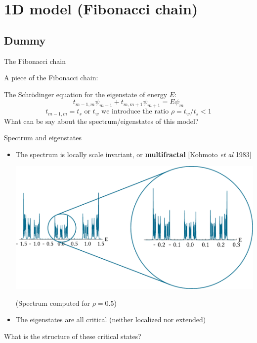 \documentclass[xcolor=x11names,compress,professionalfonts, aspectratio=169]{beamer}
\renewcommand{\(}{\begin{columns}}
\renewcommand{\)}{\end{columns}}
\newcommand{\<}[1]{\begin{column}{#1}}
\renewcommand{\>}{\end{column}}
\newcommand{\A}{\textcolor{BostonBlue}{A}}
\newcommand{\B}{\textcolor{Complementary}{B}}
\begin{document}
\section{1D model (Fibonacci chain)}
\subsection{Dummy}

\begin{frame}{The Fibonacci chain}
%		
%
		
		A piece of the Fibonacci chain:
		
		{\centering
		
		
		}
The Schrödinger equation for the eigenstate of energy $E$:
\[
	 t_{m-1,m} \psi_{m-1} + t_{m,m+1}\psi_{m+1} = E \psi_{m}
\]
\[
	t_{m-1,m} = t_s \text{~or~} t_w \text{~we introduce the ratio $\rho = t_w / t_s < 1$}
\]
What can be say about the spectrum/eigenstates of this model?
\end{frame}

\begin{frame}{Spectrum and eigenstates}
\begin{itemize}
	\item The spectrum is locally scale invariant, or \textbf{multifractal} [Kohmoto \emph{et al} 1983]
	
{\centering
\includegraphics[scale=.5]{img/ldos.pdf}

\small{(Spectrum computed for $\rho=0.5$)}
}
	\item The eigenstates are all critical (neither localized nor extended)
\end{itemize}
What is the structure of these critical states?
\end{frame}
\end{document}
